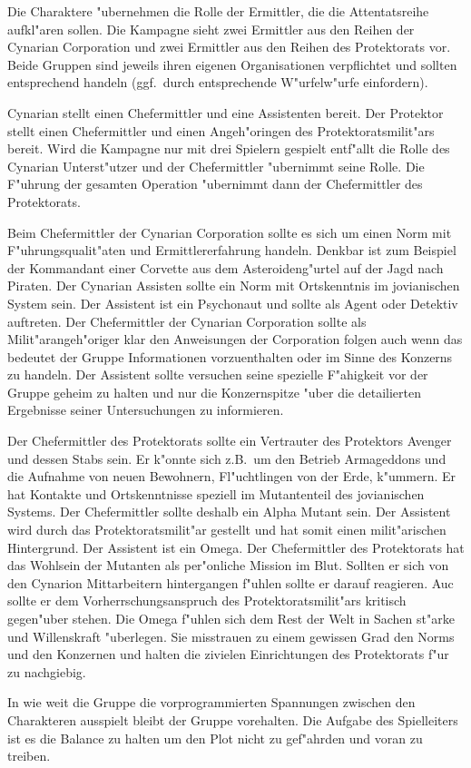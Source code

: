 
Die Charaktere "ubernehmen die Rolle der Ermittler, die die Attentatsreihe aufkl"aren sollen. Die Kampagne sieht zwei Ermittler aus den Reihen der Cynarian Corporation und zwei Ermittler aus den Reihen des Protektorats vor. Beide Gruppen sind jeweils ihren eigenen Organisationen verpflichtet und sollten entsprechend handeln (ggf.~durch entsprechende W"urfelw"urfe einfordern).

Cynarian stellt einen Chefermittler und eine Assistenten bereit. Der Protektor stellt einen Chefermittler und einen Angeh"oringen des Protektoratsmilit"ars bereit. Wird die Kampagne nur mit drei Spielern gespielt entf"allt die Rolle des Cynarian Unterst"utzer und der Chefermittler "ubernimmt seine Rolle. Die F"uhrung der gesamten Operation "ubernimmt dann der Chefermittler des Protektorats. 

Beim Chefermittler der Cynarian Corporation sollte es sich um einen Norm mit F"uhrungsqualit"aten und Ermittlererfahrung handeln. Denkbar ist zum Beispiel der Kommandant einer Corvette aus dem Asteroideng"urtel auf der Jagd nach Piraten. Der Cynarian Assisten sollte ein Norm mit Ortskenntnis im jovianischen System sein. Der Assistent ist ein Psychonaut und sollte als Agent oder Detektiv auftreten. Der Chefermittler der Cynarian Corporation sollte als Milit"arangeh"origer klar den Anweisungen der Corporation folgen auch wenn das bedeutet der Gruppe Informationen vorzuenthalten oder im Sinne des Konzerns zu handeln. Der Assistent sollte versuchen seine spezielle F"ahigkeit vor der Gruppe geheim zu halten und nur die Konzernspitze "uber die detailierten Ergebnisse seiner Untersuchungen zu informieren.

Der Chefermittler des Protektorats sollte ein Vertrauter des Protektors Avenger und dessen Stabs sein. Er k"onnte sich z.B.~um den Betrieb Armageddons und die Aufnahme von neuen Bewohnern, Fl"uchtlingen von der Erde, k"ummern. Er hat Kontakte und Ortskenntnisse speziell im Mutantenteil des jovianischen Systems. Der Chefermittler sollte deshalb ein Alpha Mutant sein. Der Assistent wird durch das Protektoratsmilit"ar gestellt und hat somit einen milit"arischen Hintergrund. Der Assistent ist ein Omega. Der Chefermittler des Protektorats hat das Wohlsein der Mutanten als per"onliche Mission im Blut. Sollten er sich von den Cynarion Mittarbeitern hintergangen f"uhlen sollte er darauf reagieren. Auc sollte er dem Vorherrschungsanspruch des Protektoratsmilit"ars kritisch gegen"uber stehen. Die Omega f"uhlen sich dem Rest der Welt in Sachen st"arke und Willenskraft "uberlegen. Sie misstrauen zu einem gewissen Grad den Norms und den Konzernen und halten die zivielen Einrichtungen des Protektorats f"ur zu nachgiebig.

In wie weit die Gruppe die vorprogrammierten Spannungen zwischen den Charakteren ausspielt bleibt der Gruppe vorehalten. Die Aufgabe des Spielleiters ist es die Balance zu halten um den Plot nicht zu gef"ahrden und voran zu treiben. 

